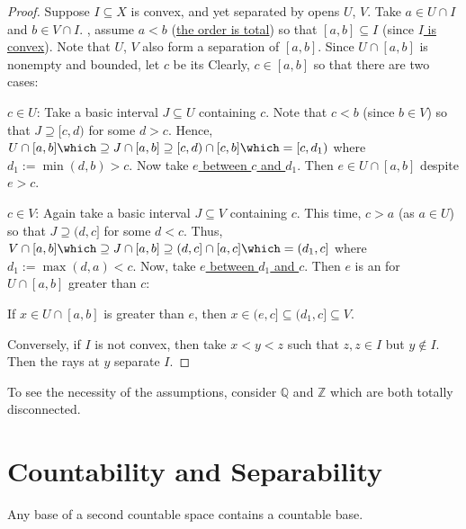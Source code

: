 	\begin{proof}
		Suppose $I\subseteq X$ is convex, and yet separated by opens $U$, $V$. Take $a\in U\cap I$ and $b\in V\cap I$. \Wlog, assume $a < b$ (\ul{the order is total}) so that $[a, b]\subseteq I$ (since \ul{$I$ is convex}). Note that $U$, $V$ also form a separation of $[a, b]$. Since $U\cap [a, b]$ is nonempty and bounded, let $c$ be its \ul{\lub} Clearly, $c\in[a, b]$ so that there are two cases:
		\begin{mylist}
			\item[$c\in U$:] Take a basic interval $J\subseteq U$ containing $c$. Note that $c < b$ (since $b\in V$) so that $J\supseteq [c, d)$ for some $d > c$. Hence, $U\cap [a, b]\which\supseteq J\cap [a, b]\supseteq[c, d)\cap[c, b] \which= [c, d_1)$ where $d_1 :=  \min(d, b) > c$. Now take \ul{$e$ between $c$ and $d_1$}. Then $e\in U\cap[a, b]$ despite $e > c$.
			
			\item[$c\in V$:] Again take a basic interval $J\subseteq V$ containing $c$. This time, $c > a$ (as $a\in U$) so that $J\supseteq (d, c]$ for some $d < c$. Thus, $V\cap[a, b]\which\supseteq J\cap[a, b]\supseteq (d, c]\cap [a, c]\which=(d_1, c]$ where $d_1 := \max(d, a) < c$. Now, take \ul{$e$ between $d_1$ and $c$}. Then $e$ is an \ub for $U\cap[a, b]$ greater than $c$:
			\begin{subproof}
				If $x\in U\cap[a, b]$ is greater than $e$, then $x\in (e, c]\subseteq(d_1, c]\subseteq V$.
			\end{subproof}
		\end{mylist}
		
		Conversely, if $I$ is not convex, then take $x < y < z$ such that $z, z\in I$ but $y\notin I$. Then the rays at $y$ separate $I$.
	\end{proof}
	
	\begin{rmk}
		To see the necessity of the assumptions, consider $\mathbb Q$ and $\mathbb Z$ \resp which are both totally disconnected.
	\end{rmk}
	



\section{Countability and Separability}

	\begin{prp}
		Any base of a second countable space contains a countable base.
	\end{prp}
	
